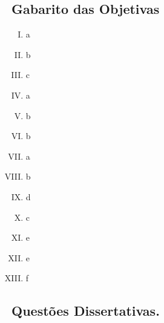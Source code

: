 \documentclass{dlproblemset}
\begin{document}
\subsection*{Gabarito das Objetivas}
\begin{enumerate}[I)]
    \item a
    \item b
    \item c
    \item a
    \item b
    \item b
    \item a
    \item b
    \item d
    \item c
    \item e
    \item e
    \item f
\end{enumerate}

\newpage

\subsection*{Questões Dissertativas.}
\end{document}

